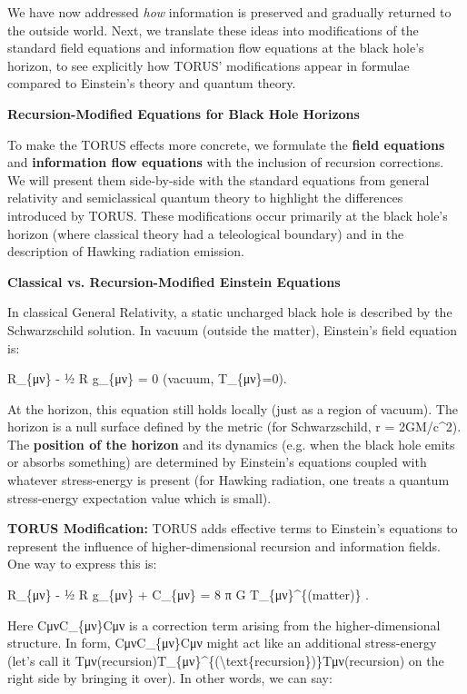 \documentclass[]{article}
\begin{document}
We have now addressed \emph{how} information is preserved and gradually
returned to the outside world. Next, we translate these ideas into
modifications of the standard field equations and information flow
equations at the black hole's horizon, to see explicitly how TORUS'
modifications appear in formulae compared to Einstein's theory and
quantum theory.

\textbf{Recursion-Modified Equations for Black Hole Horizons}

To make the TORUS effects more concrete, we formulate the \textbf{field
equations} and \textbf{information flow equations} with the inclusion of
recursion corrections. We will present them side-by-side with the
standard equations from general relativity and semiclassical quantum
theory to highlight the differences introduced by TORUS. These
modifications occur primarily at the black hole's horizon (where
classical theory had a teleological boundary) and in the description of
Hawking radiation emission.

\textbf{Classical vs. Recursion-Modified Einstein Equations}

In classical General Relativity, a static uncharged black hole is
described by the Schwarzschild solution. In vacuum (outside the matter),
Einstein's field equation is:

R\_\{μν\} - ½ R g\_\{μν\} = 0 (vacuum, T\_\{μν\}=0).

At the horizon, this equation still holds locally (just as a region of
vacuum). The horizon is a null surface defined by the metric (for
Schwarzschild, r = 2GM/c\^{}2). The \textbf{position of the horizon} and
its dynamics (e.g. when the black hole emits or absorbs something) are
determined by Einstein's equations coupled with whatever stress-energy
is present (for Hawking radiation, one treats a quantum stress-energy
expectation value which is small).

\textbf{TORUS Modification:} TORUS adds effective terms to Einstein's
equations to represent the influence of higher-dimensional recursion and
information fields. One way to express this is:

R\_\{μν\} - ½ R g\_\{μν\} + C\_\{μν\} = 8 π G T\_\{μν\}\^{}\{(matter)\}
.

Here CμνC\_\{μν\}Cμν​ is a correction term arising from the
higher-dimensional structure. In form, CμνC\_\{μν\}Cμν​ might act like
an additional stress-energy (let's call it
Tμν(recursion)T\_\{μν\}\^{}\{(\textbackslash{}text\{recursion\})\}Tμν(recursion)​
on the right side by bringing it over). In other words, we can say:
\end{document}

